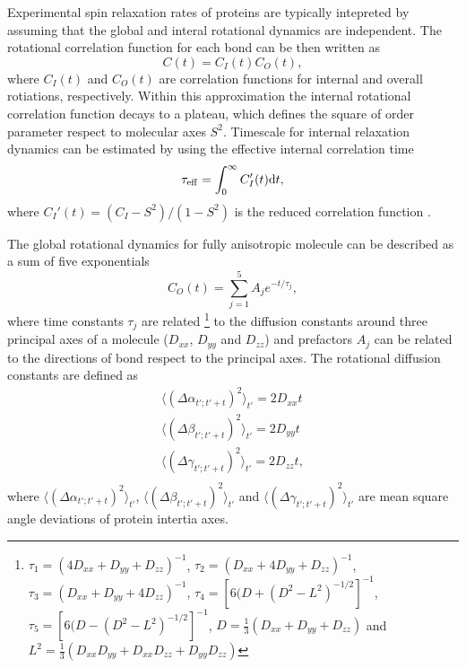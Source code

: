 \documentclass[pre,aps,floatfix,authordate1-4,twocolumn]{revtex4-1}
\begin{document}
Experimental spin relaxation rates of proteins are typically intepreted by
assuming that the global and interal rotational dynamics are independent.
The rotational correlation function for each bond can be then written as \cite{??}
\begin{equation}\label{CORRFsep}
  C(t)=C_I(t)C_O(t),
\end{equation}
where $C_I(t)$ and $C_O(t)$ are correlation functions for internal and overall
rotiations, respectively. Within this approximation 
the internal rotational correlation function decays to a plateau, which
defines the square of order parameter respect to molecular axes $S^2$.
Timescale for internal relaxation dynamics can be estimated by using the
effective internal correlation time 
\begin{equation}
  \tau_{\rm eff}=\int_0^\infty C_I'(t) \mathrm{d}t,
\end{equation}
where $C_I'(t)=(C_I-S^2)/(1-S^2)$ is the reduced correlation function \cite{??}.

The global rotational dynamics for fully anisotropic molecule
can be described as a sum of five exponentials \cite{??}
\begin{equation}\label{CORRFanisot}
  C_O(t)=\sum_{j=1}^5 A_j e^{-t/\tau_j},
\end{equation}
where time constants $\tau_j$ are related \footnote{
$\tau_1=(4D_{xx}+D_{yy}+D_{zz})^{-1}$,
$\tau_2=(D_{xx}+4D_{yy}+D_{zz})^{-1}$,
$\tau_3=(D_{xx}+D_{yy}+4D_{zz})^{-1}$,
$\tau_4=[6(D+(D^2-L^2)^{-1/2}]^{-1}$,
$\tau_5=[6(D-(D^2-L^2)^{-1/2}]^{-1}$,
$D=\frac{1}{3}(D_{xx}+D_{yy}+D_{zz})$ and 
$L^2=\frac{1}{3}(D_{xx}D_{yy}+D_{xx}D_{zz}+D_{yy}D_{zz})$} to
the diffusion constants around
three principal axes of a molecule
($D_{xx}$, $D_{yy}$ and $D_{zz}$)  and prefactors $A_j$
can be related to the directions of bond respect to the
principal axes.
The rotational diffusion constants are defined as 
\begin{equation}\label{DIFFdef}
  \begin{aligned}
    \langle (\Delta \alpha_{t';t'+t})^2 \rangle_{t'} = 2 D_{xx} t \\
    \langle (\Delta \beta_{t';t'+t})^2 \rangle_{t'} = 2 D_{yy} t \\
    \langle (\Delta \gamma_{t';t'+t})^2 \rangle_{t'} = 2 D_{zz} t, \\
  \end{aligned}
\end{equation}
where $\langle (\Delta \alpha_{t';t'+t})^2 \rangle_{t'}$,
$\langle (\Delta \beta_{t';t'+t})^2 \rangle_{t'}$ and
$\langle (\Delta \gamma_{t';t'+t})^2 \rangle_{t'}$ are mean
square angle deviations of protein intertia axes.
\end{document}
